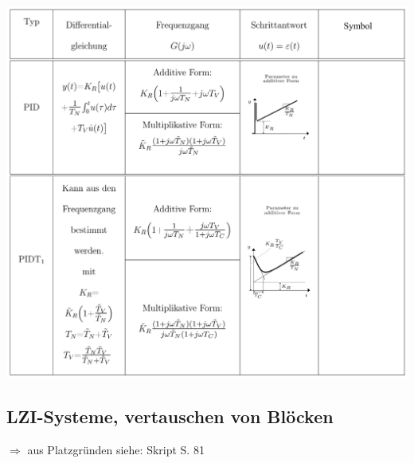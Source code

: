 			\includegraphics[width=13.5 cm]{./bilder/grundglieder/tabelle/glieder5.png} \\
			
	\subsection{LZI-Systeme, vertauschen von Blöcken }
		$\Rightarrow$ \quad aus Platzgründen siehe: Skript S. 81
			
%		




